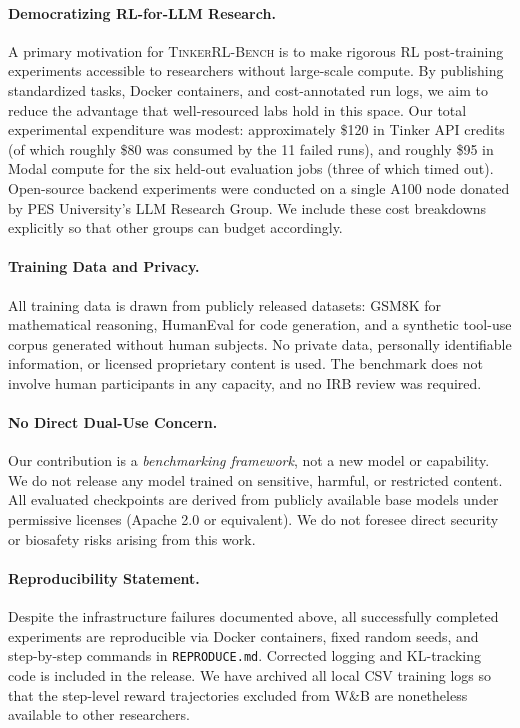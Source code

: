 \documentclass{article}
\newcommand{\ours}{\textsc{TinkerRL-Bench}}
\begin{document}
\paragraph{Democratizing RL-for-LLM Research.}
A primary motivation for \ours{} is to make rigorous RL post-training
experiments accessible to researchers without large-scale compute. By
publishing standardized tasks, Docker containers, and cost-annotated run
logs, we aim to reduce the advantage that well-resourced labs hold in this
space. Our total experimental expenditure was modest: approximately \$120 in
Tinker API credits (of which roughly \$80 was consumed by the 11 failed runs),
and roughly \$95 in Modal compute for the six held-out evaluation jobs
(three of which timed out). Open-source backend experiments were conducted on
a single A100 node donated by PES University's LLM Research Group. We include
these cost breakdowns explicitly so that other groups can budget accordingly.

\paragraph{Training Data and Privacy.}
All training data is drawn from publicly released datasets: GSM8K
\citep{cobbe2021training} for mathematical reasoning, HumanEval
\citep{chen2021codex} for code generation, and a synthetic tool-use corpus
generated without human subjects. No private data, personally identifiable
information, or licensed proprietary content is used. The benchmark does not
involve human participants in any capacity, and no IRB review was required.

\paragraph{No Direct Dual-Use Concern.}
Our contribution is a \emph{benchmarking framework}, not a new model or
capability. We do not release any model trained on sensitive, harmful, or
restricted content. All evaluated checkpoints are derived from publicly
available base models under permissive licenses (Apache 2.0 or equivalent).
We do not foresee direct security or biosafety risks arising from this work.

\paragraph{Reproducibility Statement.}
Despite the infrastructure failures documented above, all successfully
completed experiments are reproducible via Docker containers, fixed random
seeds, and step-by-step commands in \texttt{REPRODUCE.md}. Corrected logging
and KL-tracking code is included in the release. We have archived all local
CSV training logs so that the step-level reward trajectories excluded from
W\&B are nonetheless available to other researchers.
\end{document}
